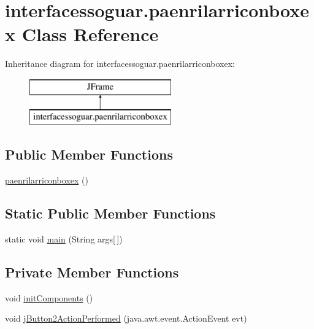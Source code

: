 \hypertarget{classinterfacessoguar_1_1paenrilarriconboxex}{}\section{interfacessoguar.\+paenrilarriconboxex Class Reference}
\label{classinterfacessoguar_1_1paenrilarriconboxex}
Inheritance diagram for interfacessoguar.\+paenrilarriconboxex\+:\begin{figure}[H]
\begin{center}
\leavevmode
\includegraphics[height=2.000000cm]{classinterfacessoguar_1_1paenrilarriconboxex}
\end{center}
\end{figure}
\subsection*{Public Member Functions}
\begin{DoxyCompactItemize}
\item 
\mbox{\hyperlink{classinterfacessoguar_1_1paenrilarriconboxex_a0fef04e41b5c114819db99ee053c370e}{paenrilarriconboxex}} ()
\end{DoxyCompactItemize}
\subsection*{Static Public Member Functions}
\begin{DoxyCompactItemize}
\item 
static void \mbox{\hyperlink{classinterfacessoguar_1_1paenrilarriconboxex_a84d168fb1b1d7a4607e63d360ac2def9}{main}} (String args\mbox{[}$\,$\mbox{]})
\end{DoxyCompactItemize}
\subsection*{Private Member Functions}
\begin{DoxyCompactItemize}
\item 
void \mbox{\hyperlink{classinterfacessoguar_1_1paenrilarriconboxex_a78ad00ab639eb66f84b15092487d2917}{init\+Components}} ()
\item 
void \mbox{\hyperlink{classinterfacessoguar_1_1paenrilarriconboxex_ad3d3c77ffada02753ef8c9de4432c0ad}{j\+Button2\+Action\+Performed}} (java.\+awt.\+event.\+Action\+Event evt)
\end{DoxyCompactItemize}
